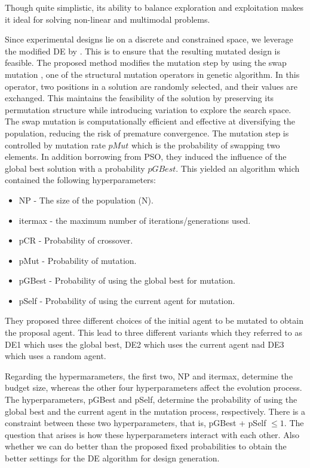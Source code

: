 \documentclass [PhD] {package/uclathes}
\begin{document}
Though quite simplistic, its ability to balance exploration and exploitation makes it ideal for solving non-linear and multimodal problems. 

Since experimental designs lie on a discrete and constrained space, we leverage the modified DE by \textcite{stokes2023metaheuristic}. This is to ensure that the resulting mutated design is feasible. The proposed method modifies the mutation step by using the swap mutation  \parencite{michalewicz2013genetic}, one of the structural mutation operators in genetic algorithm.  In this operator, two positions in a solution are randomly selected, and their values are exchanged. This maintains the feasibility of the solution by preserving its permutation structure while introducing variation to explore the search space. The swap mutation is computationally efficient and effective at diversifying the population, reducing the risk of premature convergence. The mutation step is controlled by mutation rate $pMut$ which is the probability of swapping two elements. In addition borrowing from PSO, they induced the influence of the global best solution with a probability $pGBest$. This yielded an algorithm which contained the following hyperparameters:
\begin{itemize}
    \item NP - The size of the population (N). %
    \item itermax -  the maximum number of iterations/generations used. %
    \item pCR - Probability of crossover. %
    \item pMut - Probability of mutation. %
    \item pGBest - Probability of using the global best for mutation.
    \item pSelf - Probability of using the current agent for mutation.
\end{itemize}

They proposed three different choices of the initial agent to be mutated to obtain the proposal agent. This lead to three different variants which they referred to as DE1 which uses the global best, DE2 which uses the current agent nad DE3 which uses a random agent.  

Regarding the hypermarameters, the first two, NP and itermax, determine the budget size, whereas the other four hyperparameters affect the evolution process. The hyperparameters, pGBest and pSelf, determine the probability of using the global best and the current agent in the mutation process, respectively. There is a constraint between these two hyperparameters, that is, pGBest + pSelf $\le 1$. The question that arises is how these hyperparameters interact with each other. Also whether we can do better than the proposed fixed probabilities to obtain the better settings for the DE algorithm for design generation.
\end{document}
